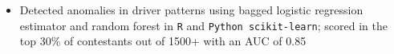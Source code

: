 \documentclass[]{deedy-resume-openfont}
\begin{document}

\begin{itemize} %

\item Detected anomalies in driver patterns using bagged logistic regression estimator and random forest in \verb|R| and \verb|Python scikit-learn|; scored in the top 30\% of contestants out of 1500+ with an AUC of 0.85


\end{itemize} %
\end{document}
